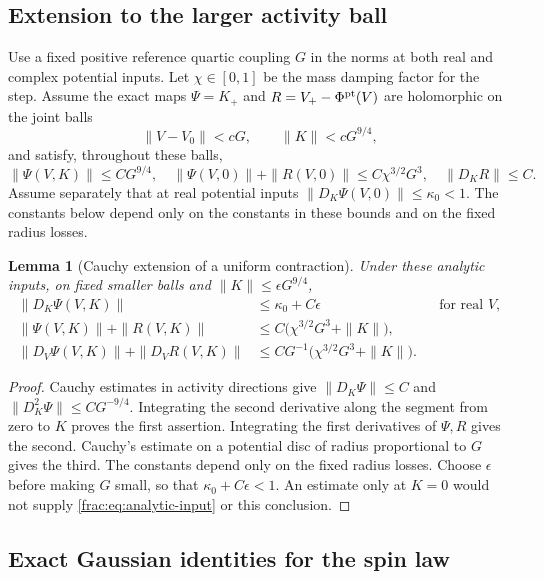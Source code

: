 \documentclass[11pt]{article}
\newtheorem{lemma}[proposition]{Lemma}
\begin{document}
\subsection{Extension to the larger activity ball}
Use a fixed positive reference quartic coupling \(G\) in the norms
at both real and complex potential inputs. Let \(\chi\in[0,1]\)
be the mass damping factor for the step.
Assume the exact maps \(\Psi=K_+\) and
\(R=V_+-\Phi^{\rm pt}(V)\) are holomorphic on the joint balls
\[
 \|V-V_0\|<cG,\qquad \|K\|<cG^{9/4},
\]
and satisfy, throughout these balls,
\begin{equation}\label{frac:eq:analytic-input}
 \|\Psi(V,K)\|\le CG^{9/4},\quad
 \|\Psi(V,0)\|+\|R(V,0)\|\le C\chi^{3/2}G^3,
 \quad \|D_KR\|\le C.
\end{equation}
Assume separately that at real potential inputs
\(\|D_K\Psi(V,0)\|\le\kappa_0<1\). The constants below depend
only on the constants in these bounds and on the fixed radius losses.

\begin{lemma}[Cauchy extension of a uniform contraction]
\label{frac:lem:cauchy}\label{lem:enlarged}
Under these analytic inputs, on fixed smaller balls and
\(\|K\|\le\epsilon G^{9/4}\),
\begin{align*}
 \|D_K\Psi(V,K)\|&\le\kappa_0+C\epsilon
                         &&\text{for real }V,\\
 \|\Psi(V,K)\|+\|R(V,K)\|
    &\le C\bigl(\chi^{3/2}G^3+\|K\|\bigr),\\
 \|D_V\Psi(V,K)\|+\|D_VR(V,K)\|
    &\le CG^{-1}\bigl(\chi^{3/2}G^3+\|K\|\bigr).
\end{align*}
\end{lemma}
\begin{proof}
Cauchy estimates in activity directions give
\(\|D_K\Psi\|\le C\) and
\(\|D_K^2\Psi\|\le CG^{-9/4}\). Integrating the second derivative
along the segment from zero to \(K\) proves the first assertion.
Integrating the first derivatives of \(\Psi,R\) gives the second.
Cauchy's estimate on a potential disc of radius proportional to \(G\)
gives the third. The constants depend only on the fixed radius losses.
Choose \(\epsilon\) before making \(G\) small, so that
\(\kappa_0+C\epsilon<1\). An estimate only at \(K=0\) would not
supply \eqref{frac:eq:analytic-input} or this conclusion.
\end{proof}

\subsection{Exact Gaussian identities for the spin law}
\label{sec:shared-gaussian}
\end{document}

